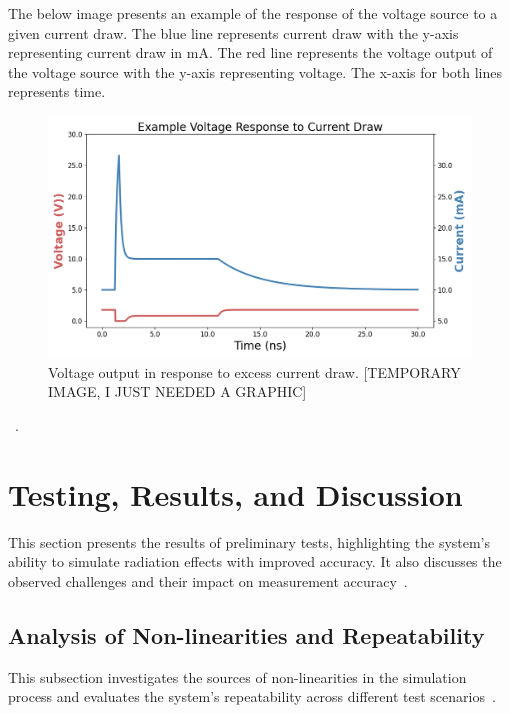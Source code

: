 \documentclass[conference]{IEEEtran}
\begin{document}
    The below image presents an example of the response of the voltage source to a given current draw.
    The blue line represents current draw with the y-axis representing current draw in mA. The red line represents the voltage output of the voltage source with the y-axis representing voltage.
    The x-axis for both lines represents time.

    \begin{figure}[htbp]
        \centering
        \includegraphics[width=0.95\linewidth]{Rail_Collapse_Response}
        \caption{Voltage output in response to excess current draw. [TEMPORARY IMAGE, I JUST NEEDED A GRAPHIC]}
        \label{fig:rail_collapse_response}
    \end{figure}~\cite{Massengill1984}.


    \section{Testing, Results, and Discussion}\label{sec:testing-results-and-discussion}
    This section presents the results of preliminary tests, highlighting the system's ability to simulate radiation effects with improved accuracy.
    It also discusses the observed challenges and their impact on measurement accuracy~\cite{Pepper1990}.

    \subsection{Analysis of Non-linearities and Repeatability}\label{subsec:analysis-of-non-linearities-and-repeatability}
    This subsection investigates the sources of non-linearities in the simulation process and evaluates the system's repeatability across different test scenarios~\cite{Pepper1990}.
\end{document}
